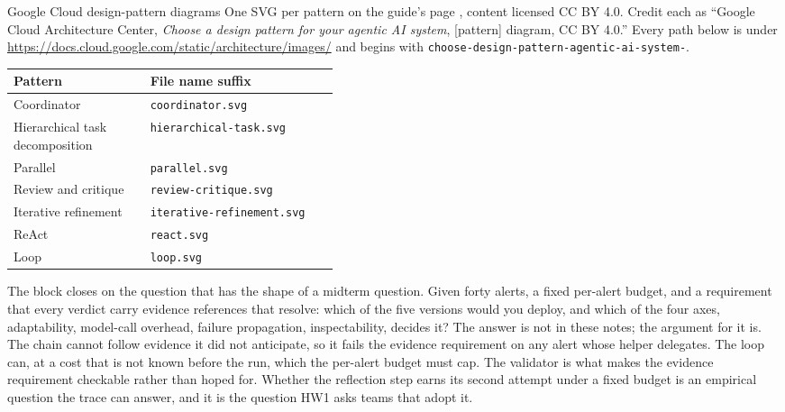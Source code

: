 \begin{figneeded}{Google Cloud design-pattern diagrams}
One SVG per pattern on the guide's page \citep{google2026patterns}, content licensed CC BY
4.0. Credit each as ``Google Cloud Architecture Center, \emph{Choose a design pattern for
your agentic AI system}, [pattern] diagram, CC BY 4.0.'' Every path below is under
\url{https://docs.cloud.google.com/static/architecture/images/} and begins with
\texttt{choose-design-pattern-agentic-ai-system-}.
\begin{center}
\begin{adjustbox}{width=\linewidth}\begin{tabularx}{\linewidth}{@{}L{0.42\linewidth}X@{}}
  \toprule
  Pattern & File name suffix \\
  \midrule
  Coordinator & \texttt{coordinator.svg} \\
  Hierarchical task decomposition & \texttt{hierarchical-task.svg} \\
  Parallel & \texttt{parallel.svg} \\
  Review and critique & \texttt{review-critique.svg} \\
  Iterative refinement & \texttt{iterative-refinement.svg} \\
  ReAct & \texttt{react.svg} \\
  Loop & \texttt{loop.svg} \\
  \bottomrule
\end{tabularx}\end{adjustbox}
\end{center}
\end{figneeded}

The block closes on the question that has the shape of a midterm question. Given forty
alerts, a fixed per-alert budget, and a requirement that every verdict carry evidence
references that resolve: which of the five versions would you deploy, and which of the four axes,
adaptability, model-call overhead, failure propagation, inspectability, decides it? The
answer is not in these notes; the argument for it is. The chain cannot follow
evidence it did not anticipate, so it fails the evidence requirement on any alert whose
helper delegates. The loop can, at a cost that is not known before the run,
which the per-alert budget must cap. The validator is what makes the evidence
requirement checkable rather than hoped for. Whether the reflection step earns its second
attempt under a fixed budget is an empirical question the trace can answer, and it is the
question HW1 asks teams that adopt it.

